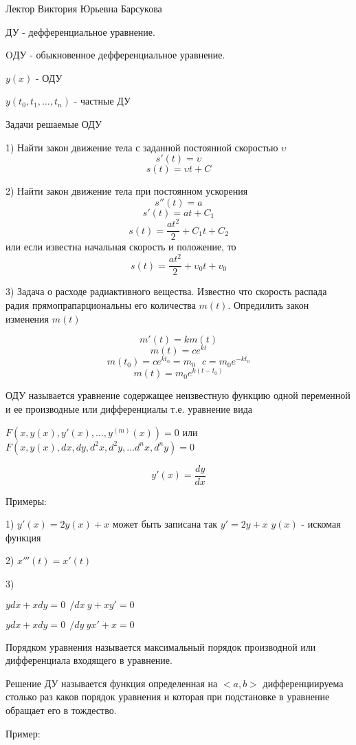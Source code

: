 Лектор Виктория Юрьевна Барсукова

ДУ - дефференциальное уравнение.

OДУ - обыкновенное дефференциальное уравнение.

$y(x)$ - ОДУ

$y(t_0, t_1, \ldots, t_n)$ - частные ДУ

Задачи решаемые ОДУ

1) Найти закон движение тела с заданной постоянной скоростью $\upsilon$
$$
s' (t) = \upsilon
$$
$$
s (t) = \upsilon t + C
$$

2) Найти закон движение тела при постоянном ускорения
$$
s'' (t) = a
$$
$$
s'(t) = at + C_1
$$
$$
s(t) = \frac{at^2}{2} + C_1 t + C_2
$$
или если известна начальная скорость и положение, то
$$
s(t) = \frac{at^2}{2} + \upsilon_0 t + v_0
$$

3) Задача о расходе радиактивного вещества. Известно что скорость распада радия
прямопрапарциональны его количества $m(t)$. Опредилить закон изменения $m(t)$

$$
m'(t) = k m(t)
$$
$$
m(t) = c e^{kt}
$$
$$
m(t_0) = c e^{kt_0} = m_0 ~~~ c = m_0 e^{-kt_0}
$$
$$
m(t) = m_0e^{k(t-t_0)}
$$

\begin{define}
  ОДУ называется уравнение содержащее неизвестную функцию одной переменной и ее
  производные или дифференциалы т.е. уравнение вида

  $F(x, y(x), y'(x), \ldots, y^{(m)} (x)) = 0$ или
  $F(x, y(x), dx, dy, d^2 x, d^2 y, \ldots d^n x, d^n y) = 0$

  $$
  y'(x) = \frac{dy}{dx}
  $$
\end{define}
Примеры:

1) $y'(x) = 2 y(x) + x$ может быть записана так $y' = 2y + x$ $y(x)$ - искомая
функция

2) $x'''(t) = x'(t)$

3)

$ydx + xdy = 0 ~~ / dx ~ y + xy' = 0$

$ydx + xdy = 0 ~~ / dy ~ yx' + x = 0$

\begin{define}
  Порядком уравнения называется максимальный порядок производной или
  дифференциала входящего в уравнение.
\end{define}

\begin{define}[решения ДУ]
  Решение ДУ называется функция определенная на $<a,b>$ дифференциируема столько
  раз каков порядок уравнения и которая при подстановке в уравнение обращает его
  в тождество.
\end{define}
Пример:

